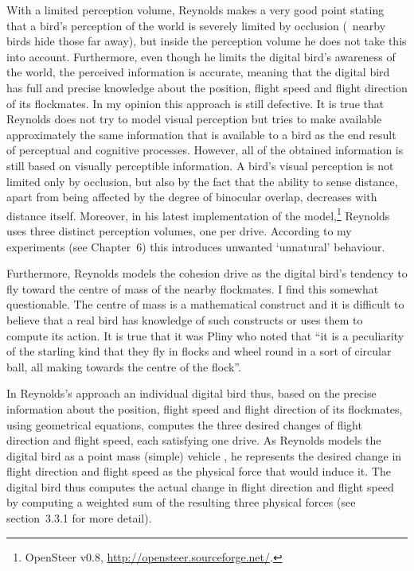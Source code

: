With a limited perception volume, Reynolds makes a very good point stating that a bird's perception of the world is severely limited by occlusion (\ie\ nearby birds hide those far away), but inside the perception volume he does not take this into account. Furthermore, even though he limits the digital bird's awareness of the world, the perceived information is accurate, meaning that the digital bird has full and precise knowledge about the position, flight speed and flight direction of its flockmates. In my opinion this approach is still defective. It is true that Reynolds does not try to model visual perception but tries to make available approximately the same information that is available to a bird as the end result of perceptual and cognitive processes. However, all of the obtained information is still based on visually perceptible information. A bird's visual perception is not limited only by occlusion, but also by the fact that the ability to sense distance, apart from being affected by the degree of binocular overlap, decreases with distance itself. Moreover, in his latest implementation of the model,\footnote{OpenSteer v0.8, \href{http://opensteer.sourceforge.net/}{http://opensteer.sourceforge.net/}.} Reynolds uses three distinct perception volumes, one per drive. According to my experiments (see Chapter~6) this introduces unwanted `unnatural' behaviour.

Furthermore, Reynolds models the cohesion drive as the digital bird's tendency to fly toward the centre of mass of the nearby flockmates. I find this somewhat questionable. The centre of mass is a mathematical construct and it is difficult to believe that a real bird has knowledge of such constructs or uses them to compute its action. It is true that it was Pliny \cite{heppner:1997} who noted that ``it is a peculiarity of the starling kind that they fly in flocks and wheel round in a sort of circular ball, all making towards the centre of the flock''. 

In Reynolds's approach an individual digital bird thus, based on the precise information about the position, flight speed and flight direction of its flockmates, using geometrical equations, computes the three desired changes of flight direction and flight speed, each satisfying one drive. As Reynolds models the digital bird as a point mass (simple) vehicle \cite{reynolds:1987,reynolds:1999}, he represents the desired change in flight direction and flight speed as the physical force that would induce it. The digital bird thus computes the actual change in flight direction and flight speed by computing a weighted sum of the resulting three physical forces (see section~3.3.1 for more detail).
 
